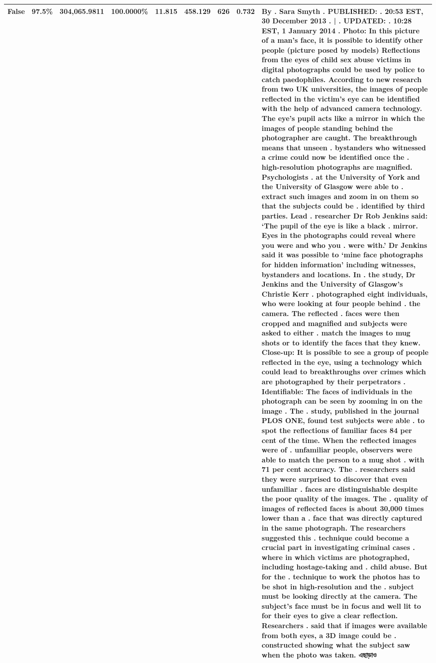 \begin{table}[H]
\begin{tabular}{lllrlllll}
\cline{1-9}
False & 97.5\% & \color{red} 304,065.9811 & \bfseries \color{red} 100.0000\% & 11.815 & 458.129 & 626 & 0.732 & By . Sara Smyth . PUBLISHED: . 20:53 EST, 30 December 2013 . | . UPDATED: . 10:28 EST, 1 January 2014 . Photo: In this picture of a man's face, it is possible to identify other people (picture posed by models) Reflections from the eyes of child sex abuse victims in digital photographs could be used by police to catch paedophiles. According to new research from two UK universities, the images of people reflected in the victim's eye can be identified with the help of advanced camera technology. The eye's pupil acts like a mirror in which the images of people standing behind the photographer are caught. The breakthrough means that unseen . bystanders who witnessed a crime could now be identified once the . high-resolution photographs are magnified. Psychologists . at the University of York and the University of Glasgow were able to . extract such images and zoom in on them so that the subjects could be . identified by third parties. Lead . researcher Dr Rob Jenkins said: ‘The pupil of the eye is like a black . mirror. Eyes in the photographs could reveal where you were and who you . were with.' Dr Jenkins said it was possible to ‘mine face photographs for hidden information' including witnesses, bystanders and locations. In . the study, Dr Jenkins and the University of Glasgow's Christie Kerr . photographed eight individuals, who were looking at four people behind . the camera. The reflected . faces were then cropped and magnified and subjects were asked to either . match the images to mug shots or to identify the faces that they knew. Close-up: It is possible to see a group of people reflected in the eye, using a technology which could lead to breakthroughs over crimes which are photographed by their perpetrators . Identifiable: The faces of individuals in the photograph can be seen by zooming in on the image . The . study, published in the journal PLOS ONE, found test subjects were able . to spot the reflections of familiar faces 84 per cent of the time. When the reflected images were of . unfamiliar people, observers were able to match the person to a mug shot . with 71 per cent accuracy. The . researchers said they were surprised to discover that even unfamiliar . faces are distinguishable despite the poor quality of the images. The . quality of images of reflected faces is about 30,000 times lower than a . face that was directly captured in the same photograph. The researchers suggested this . technique could become a crucial part in investigating criminal cases . where in which victims are photographed, including hostage-taking and . child abuse. But for the . technique to work the photos has to be shot in high-resolution and the . subject must be looking directly at the camera. The subject's face must be in focus and well lit to for their eyes to give a clear reflection. Researchers . said that if images were available from both eyes, a 3D image could be . constructed showing what the subject saw when the photo was taken. এছাড়াও \\
\cline{1-9}
\bottomrule
\end{tabular}
\end{table}
